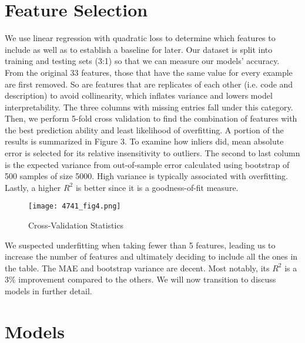 \documentclass{article}
\begin{document}
\section{Feature Selection}
We use linear regression with quadratic loss to determine which features to include as well as to establish a baseline for later. Our dataset is split into training and testing sets (3:1) so that we can measure our models’ accuracy. From the original 33 features, those that have the same value for every example are first removed. So are features that are replicates of each other (i.e. code and description) to avoid collinearity, which inflates variance and lowers model interpretability. The three columns with missing entries fall under this category. 
\newline
\newline
Then, we perform 5-fold cross validation to find the combination of features with the best prediction ability and least likelihood of overfitting. A portion of the results is summarized in Figure 3. To examine how inliers did, mean absolute error is selected for its relative insensitivity to outliers. The second to last column is the expected variance from out-of-sample error calculated using bootstrap of 500 samples of size 5000. High variance is typically associated with overfitting. Lastly, a higher $R^2$ is better since it is a goodness-of-fit measure.
\newline\begin{figure}[H]
    \centering
    \texttt{[image: 4741\_fig4.png]}
    \caption{Cross-Validation Statistics}
\end{figure}
\noindent
We suspected underfitting when taking fewer than 5 features, leading us to increase the number of features and ultimately deciding to include all the ones in the table. The MAE and bootstrap variance are decent. Most notably, its $R^2$ is a 3\% improvement compared to the others. We will now transition to discuss models in further detail.
\newline

\section{Models}
\end{document}
